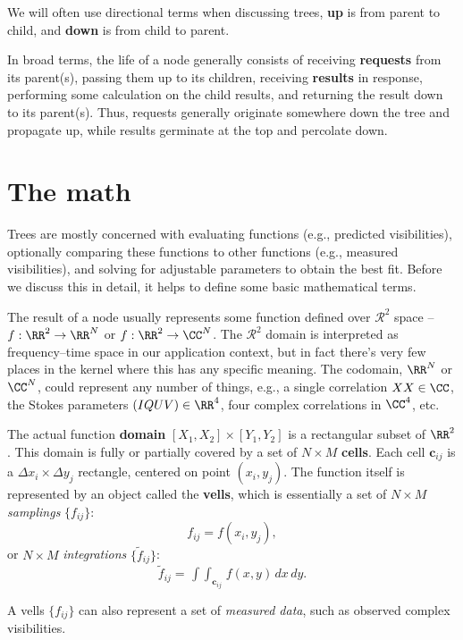   We will often use directional terms when discussing trees, {\bf up} is from
  parent to child, and {\bf down} is from child to parent.

  In broad terms, the life of a node generally consists of receiving {\bf
  requests} from its parent(s), passing them up to its children, receiving {\bf
  results} in response, performing some calculation on the child results, and
  returning the result down to its parent(s). Thus, requests generally originate
  somewhere down the tree and propagate up, while results germinate at the top
  and percolate down. 

\section{The math}
  \label{sec:math}

  Trees are mostly concerned with evaluating functions (e.g., predicted
  visibilities), optionally comparing these functions to other functions (e.g.,
  measured visibilities), and solving for adjustable parameters to obtain the
  best fit. Before we discuss this in detail, it helps to define some basic 
  mathematical terms.

  The result of a node usually represents some function defined over
  $\mathcal{R}^2$ space -- $f:\RR^2\rightarrow\RR^N$ or
  $f:\RR^2\rightarrow\CC^N$. The $\mathcal{R}^2$ domain is interpreted as
  frequency--time space in our application context, but in fact there's very
  few places in the kernel where this has any specific meaning. The codomain,
  $\RR^N$ or $\CC^N$, could represent any number of things, e.g., a single
  correlation $XX\in\CC$, the Stokes parameters $(IQUV)\in\RR^4$, four complex
  correlations in $\CC^4$, etc.

  The actual function {\bf domain} $[X_1,X_2]\times[Y_1,Y_2]$  is a rectangular
  subset of $\RR^2$. This domain is fully or partially covered  by a set of
  $N\times M$ {\bf cells}. Each cell ${\mathbf c}_{ij}$ is a $\Delta
  x_i\times\Delta y_j$ rectangle, centered on point $(x_i,y_j)$. The function
  itself is represented by an object called the {\bf vells}, which is
  essentially a set of $N\times M$ {\em samplings}\/ $\{f_{ij}\}$: 
  $$f_{ij}=f(x_i,y_j),$$ or $N\times M$ {\em integrations}\/
  $\{\tilde{f}_{ij}\}$: $$ \tilde{f}_{ij}=\mathop{\int\!\!\!\int}_{{\mathbf
  c}_{ij}}f(x,y)\,dx\,dy.$$

  A vells $\{f_{ij}\}$ can also represent a set of {\em measured data}, such as
  observed complex visibilities. 
  
